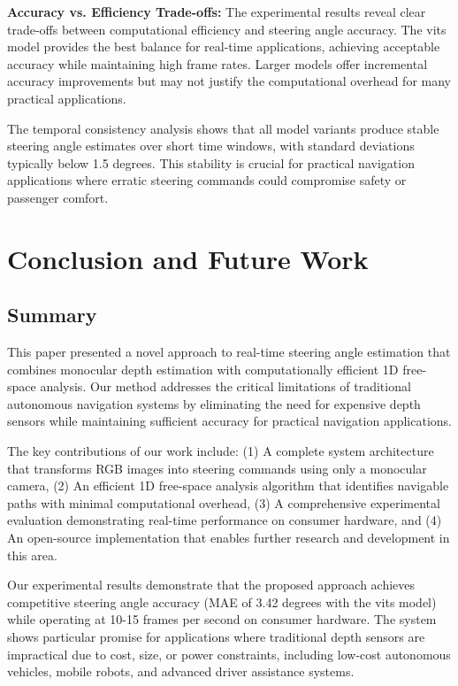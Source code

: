 \documentclass[conference]{IEEEtran}
\begin{document}
\textbf{Accuracy vs. Efficiency Trade-offs:}
The experimental results reveal clear trade-offs between computational efficiency and steering angle accuracy. The vits model provides the best balance for real-time applications, achieving acceptable accuracy while maintaining high frame rates. Larger models offer incremental accuracy improvements but may not justify the computational overhead for many practical applications.

The temporal consistency analysis shows that all model variants produce stable steering angle estimates over short time windows, with standard deviations typically below 1.5 degrees. This stability is crucial for practical navigation applications where erratic steering commands could compromise safety or passenger comfort.

\section{Conclusion and Future Work}

\subsection{Summary}
This paper presented a novel approach to real-time steering angle estimation that combines monocular depth estimation with computationally efficient 1D free-space analysis. Our method addresses the critical limitations of traditional autonomous navigation systems by eliminating the need for expensive depth sensors while maintaining sufficient accuracy for practical navigation applications.

The key contributions of our work include: (1) A complete system architecture that transforms RGB images into steering commands using only a monocular camera, (2) An efficient 1D free-space analysis algorithm that identifies navigable paths with minimal computational overhead, (3) A comprehensive experimental evaluation demonstrating real-time performance on consumer hardware, and (4) An open-source implementation that enables further research and development in this area.

Our experimental results demonstrate that the proposed approach achieves competitive steering angle accuracy (MAE of 3.42 degrees with the vits model) while operating at 10-15 frames per second on consumer hardware. The system shows particular promise for applications where traditional depth sensors are impractical due to cost, size, or power constraints, including low-cost autonomous vehicles, mobile robots, and advanced driver assistance systems.
\end{document}
